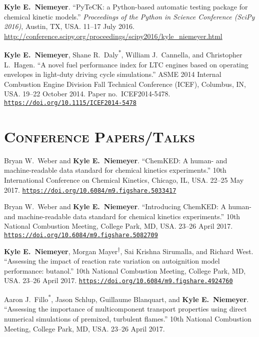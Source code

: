 \documentclass[margin,line,11pt]{res}
\makeatletter
\newlength{\bibhang}
\newlength{\bibsep}
 {\@listi \global\bibsep\itemsep \global\advance\bibsep by\parsep}
\newenvironment{bibenum*}
  {\renewcommand\labelenumi{\theenumi.}%
   \etaremune[
     topsep=0pt,
     itemsep=\bibsep,
     parsep=0pt,partopsep=0pt,
     itemindent=-\bibhang,
     leftmargin={\bibhang+\widthof{[999]}}]}
  {\endetaremune}
\newcommand*{\doi}[1]{\href{https://doi.org/#1}{\nolinkurl{https://doi.org/#1}}}
\newcommand*{\grad}[0]{\textsuperscript{*}}
\newcommand*{\ugrad}[0]{\textsuperscript{$\dagger$}}
\makeatother
\begin{document}
\begin{resume}
\begin{bibenum*}
\item \textbf{Kyle E.~Niemeyer}.
``PyTeCK: a Python-based automatic testing package for chemical kinetic models.''
\emph{Proceedings of the  Python in Science Conference (SciPy 2016)},
Austin, TX, USA.
11--17 July 2016.
\url{http://conference.scipy.org/proceedings/scipy2016/kyle_niemeyer.html}

\item \textbf{Kyle E.~Niemeyer}, Shane R.\ Daly\textsuperscript{*}, William J.\ Cannella, and Christopher L.\ Hagen.
``A novel fuel performance index for LTC engines based on operating envelopes in light-duty driving cycle simulations.''
ASME 2014 Internal Combustion Engine Division Fall Technical Conference (ICEF), Columbus, IN, USA.
19--22 October 2014.
Paper no.~ICEF2014-5478.
\doi{10.1115/ICEF2014-5478}

\end{bibenum*}

\section{\textsc{Conference Papers\slash Talks}}

\begin{bibenum*}

\item Bryan W.~Weber and \textbf{Kyle E.~Niemeyer}.
``ChemKED: A human- and machine-readable data standard for chemical kinetics experiments.''
10th International Conference on Chemical Kinetics, Chicago, IL, USA.
22--25 May 2017.
\doi{10.6084/m9.figshare.5033417}

\item Bryan W.~Weber and \textbf{Kyle E.~Niemeyer}.
``Introducing ChemKED: A human- and machine-readable data standard for chemical kinetics experiments.''
10th National Combustion Meeting, College Park, MD, USA.
23--26 April 2017.
\doi{10.6084/m9.figshare.5082709}

\item \textbf{Kyle E.~Niemeyer}, Morgan Mayer\ugrad{}, Sai Krishna Sirumalla, and Richard West.
``Assessing the impact of reaction rate variation on autoignition model performance: butanol.''
10th National Combustion Meeting, College Park, MD, USA.
23--26 April 2017.
\doi{10.6084/m9.figshare.4924760}

\item Aaron J.~Fillo\grad{}, Jason Schlup, Guillaume Blanquart, and \textbf{Kyle E.~Niemeyer}.
``Assessing the importance of multicomponent transport properties using direct numerical simulations of premixed, turbulent flames.''
10th National Combustion Meeting, College Park, MD, USA.
23--26 April 2017.


\end{bibenum*}
\end{resume}
\end{document}
